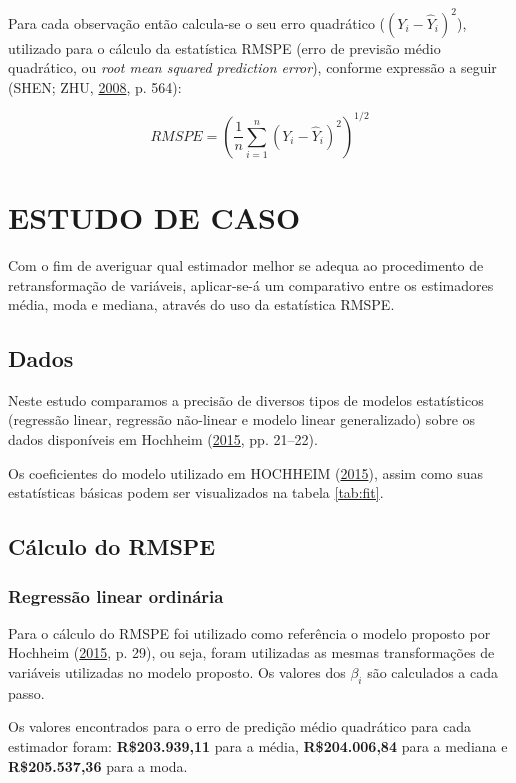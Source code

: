\documentclass[a4paper]{article}
\begin{document}
Para cada observação então calcula-se o seu erro quadrático
(\((Y_i - \hat{Y}_i)^2\)), utilizado para o cálculo da estatística RMSPE
(erro de previsão médio quadrático, ou \emph{root mean squared
prediction error}), conforme expressão a seguir (SHEN; ZHU,
\protect\hyperlink{ref-shen}{2008}, p. 564):

\[RMSPE = (\frac{1}{n}\sum_{i = 1}^{n}(Y_i - \hat{Y}_i)^2)^{1/2}\]

\section{ESTUDO DE CASO}\label{estudo-de-caso}

Com o fim de averiguar qual estimador melhor se adequa ao procedimento
de retransformação de variáveis, aplicar-se-á um comparativo entre os
estimadores média, moda e mediana, através do uso da estatística RMSPE.

\subsection{Dados}\label{dados}

Neste estudo comparamos a precisão de diversos tipos de modelos
estatísticos (regressão linear, regressão não-linear e modelo linear
generalizado) sobre os dados disponíveis em Hochheim
(\protect\hyperlink{ref-hochheim}{2015}, pp. 21--22).

Os coeficientes do modelo utilizado em HOCHHEIM
(\protect\hyperlink{ref-hochheim}{2015}), assim como suas estatísticas
básicas podem ser visualizados na tabela \ref{tab:fit}.

\subsection{Cálculo do RMSPE}\label{calculo-do-rmspe}

\subsubsection{Regressão linear
ordinária}\label{regressao-linear-ordinaria}

Para o cálculo do RMSPE foi utilizado como referência o modelo proposto
por Hochheim (\protect\hyperlink{ref-hochheim}{2015}, p. 29), ou seja,
foram utilizadas as mesmas transformações de variáveis utilizadas no
modelo proposto. Os valores dos \(\beta_i\) são calculados a cada passo.

Os valores encontrados para o erro de predição médio quadrático para
cada estimador foram: \textbf{R\$203.939,11} para a média,
\textbf{R\$204.006,84} para a mediana e \textbf{R\$205.537,36} para a
moda.
\end{document}
